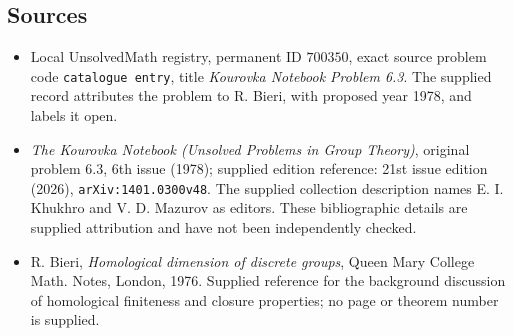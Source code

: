 \documentclass[11pt]{article}
\begin{document}
\subsection{Sources}
\begin{itemize}
\item Local UnsolvedMath registry, permanent ID \(700350\), exact source problem code \texttt{catalogue entry}, title \emph{Kourovka Notebook Problem 6.3}. The supplied record attributes the problem to R. Bieri, with proposed year 1978, and labels it open.
\item \emph{The Kourovka Notebook (Unsolved Problems in Group Theory)}, original problem 6.3, 6th issue (1978); supplied edition reference: 21st issue edition (2026), \texttt{arXiv:1401.0300v48}. The supplied collection description names E. I. Khukhro and V. D. Mazurov as editors. These bibliographic details are supplied attribution and have not been independently checked.
\item R. Bieri, \emph{Homological dimension of discrete groups}, Queen Mary College Math. Notes, London, 1976. Supplied reference for the background discussion of homological finiteness and closure properties; no page or theorem number is supplied.
\end{itemize}
\end{document}
